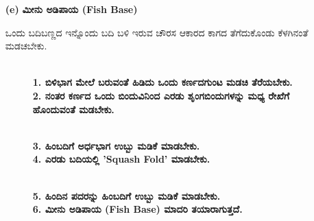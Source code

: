 \begin{enumerate}
\item[{\bf (e)}] \textbf{ಮೀನು ಅಡಿಪಾಯ (Fish Base)}

ಒಂದು ಬದಿಬಣ್ಣದ ಇನ್ನೊಂದು ಬದಿ ಬಳಿ ಇರುವ ಚೌರಸ ಆಕಾರದ ಕಾಗದ ತೆಗೆದುಕೊಂಡು ಕೆಳಗಿನಂತೆ ಮಡಚಬೇಕು.
\begin{figure}[H]
\\
\textbf{1. ಬಿಳಿಭಾಗ ಮೇಲೆ ಬರುವಂತೆ ಹಿಡಿದು ಒಂದು ಕರ್ಣದಗುಂಟ ಮಡಚಿ ತೆರೆಯಬೇಕು.}\\
\textbf{2. ನಂತರ ಕರ್ಣದ ಒಂದು ಬಿಂದುವಿನಿಂದ ಎರಡು ಶೃಂಗಬಿಂದುಗಳನ್ನು ಮಧ್ಯ ರೇಖೆಗೆ ಹೊಂದುವಂತೆ ಮಡಬೇಕು.}
\end{figure}
\begin{figure}[H]
\\
\textbf{3. ಹಿಂಬದಿಗೆ ಅರ್ಧಭಾಗ ಉಬ್ಬು ಮಡಿಕೆ ಮಾಡಬೇಕು.}\\
\textbf{4. ಎರಡು ಬದಿಯಲ್ಲಿ 'Squash Fold' ಮಾಡಬೇಕು.}
\end{figure}
\begin{figure}[H]
\\
\textbf{5. ಹಿಂದಿನ ಪದರನ್ನು ಹಿಂಬದಿಗೆ ಉಬ್ಬು ಮಡಿಕೆ ಮಾಡಬೇಕು. }\\
\textbf{6. ಮೀನು ಅಡಿಪಾಯ (Fish Base) ಮಾದರಿ ತಯಾರಾಗುತ್ತದೆ.}
\end{figure}



\end{enumerate}
